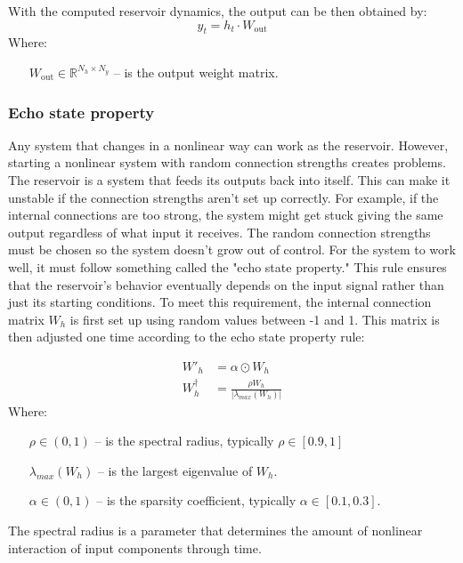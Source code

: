 \documentclass[11pt, oneside]{article}
\begin{document}
With the computed reservoir dynamics, the output can be then obtained by:
\begin{equation}
    y_t = h_t \cdot W_{\mathrm{out}}
\end{equation}
Where:
\begin{itemize}[noitemsep, leftmargin=4cm, label={}]
    \item [\(W_{\mathrm{out}} \in \mathbb{R}^{N_h \times N_y}\)] -- is the output weight matrix.
\end{itemize}

\subsubsection{Echo state property}

Any system that changes in a nonlinear way can work as the reservoir. However, starting a nonlinear system with random connection strengths creates problems.
The reservoir is a system that feeds its outputs back into itself. This can make it unstable if the connection strengths aren't set up correctly. For example, if the internal connections are too strong, the system might get stuck giving the same output regardless of what input it receives. The random connection strengths must be chosen so the system doesn't grow out of control.
For the system to work well, it must follow something called the "echo state property." This rule ensures that the reservoir's behavior eventually depends on the input signal rather than just its starting conditions.
To meet this requirement, the internal connection matrix \(W_h\) is first set up using random values between -1 and 1. This matrix is then adjusted one time according to the echo state property rule:

\begin{align}
    W'_h          & = \alpha \odot {W_h}                                             \\
    W_h^{\dagger} & = \frac{\rho  W_h}{\left\lvert \lambda_{max}(W_h) \right\rvert }
\end{align}
Where:
\begin{itemize}[noitemsep, leftmargin=4cm, label={}]
    \item [\(\rho \in (0,1)\)] -- is the spectral radius, typically \(\rho \in [0.9, 1]\)
    \item [\(\lambda_{max}(W_h)\)] -- is the largest eigenvalue of \(W_h \).
    \item[\(\alpha \in (0,1)\)] -- is the sparsity coefficient, typically \(\alpha \in [0.1, 0.3]\).
\end{itemize}
The spectral radius is a parameter that determines the amount of nonlinear interaction of input components through time.
\end{document}
